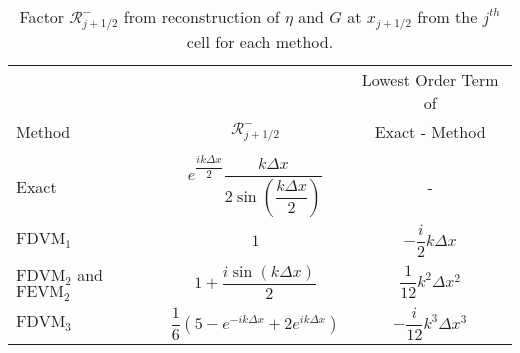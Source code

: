 \begin{table}
	\centering
	\begin{tabular}{l  c  c}
		&&Lowest Order Term of	\\
		Method& $\mathcal{R}^-_{j+1/2}$ &  Exact - Method\B \\
		\hline \\
		Exact & $e^{\dfrac{ik\Delta x}{2}} \dfrac{k\Delta x}{2 \sin\left(\dfrac{k \Delta x}{2}\right)}$ & - \B \\
		$\text{FDVM}_1$& $1$ & $-\dfrac{i}{2}k \Delta x$  \T\B \\
		$\text{FDVM}_2$ and $\text{FEVM}_2$& $1 +  \dfrac{i \sin\left(k\Delta x \right)}{2}$ & $\dfrac{1}{12}k^2 \Delta x^2$  \T\B \\
		$\text{FDVM}_3$& $\dfrac{1}{6}\left({5 - e^{-i k {\Delta x}} +2 e^{i k {\Delta x}}} \right)$ & $-\dfrac{i}{12}k^3 \Delta x^3$  \T\B \\
		\hline
	\end{tabular}
	\caption{Factor $\mathcal{R}^-_{j+1/2}$ from reconstruction of $\eta$ and $G$ at $x_{j+1/2}$ from the ${j^{th}}$ cell for each method.}
	\label{tab:Rmfactor}
\end{table}
